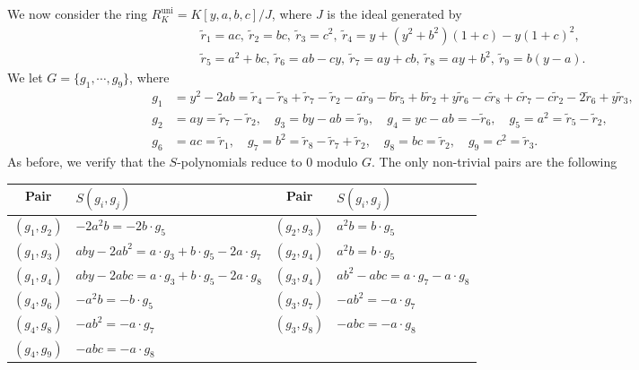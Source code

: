 \documentclass[a4paper, notitlepage, 10pt]{amsart}
\theoremstyle{plain} %
\theoremstyle{definition} %
\theoremstyle{remark} %
\numberwithin{equation}{section}
\newcommand{\uni}{\operatorname{uni}}
\begin{document}
\subsection{} We now consider the ring $R^{\uni}_K=K[y,a,b,c]/J$, where $J$ is the ideal generated by 
\begin{gather*}\widetilde{r}_1=ac, \ \widetilde{r}_2=bc, \ \widetilde{r}_3=c^2, \ 
\widetilde{r}_4=y+(y^2+b^2)(1+c)-y(1+c)^2,\\   \widetilde{r}_5=a^2+bc,\  \widetilde{r}_6=ab-cy, \  \widetilde{r}_7=ay+cb, \ \widetilde{r}_8=ay+b^2, \ \widetilde{r}_9=b(y-a).
\end{gather*}
We let $G=\{g_1,\cdots,g_9\}$, where
\begin{align*}
g_1 &= y^2 - 2ab = \widetilde{r}_4 - \widetilde{r}_8 + \widetilde{r}_7 - \widetilde{r}_2 - a\widetilde{r}_9 - b\widetilde{r}_5 + b\widetilde{r}_2 + y\widetilde{r}_6 - c\widetilde{r}_8 + c\widetilde{r}_7 - c\widetilde{r}_2 - 2\widetilde{r}_6 + y\widetilde{r}_3, \\
g_2 &= ay = \widetilde{r}_7 - \widetilde{r}_2, \quad g_3 = by - ab = \widetilde{r}_9, \quad g_4 = yc - ab = -\widetilde{r}_6, \quad
g_5= a^2 = \widetilde{r}_5 - \widetilde{r}_2, \\ g_6 &= ac = \widetilde{r}_1, \quad g_7 = b^2 = \widetilde{r}_8 - \widetilde{r}_7 + \widetilde{r}_2, \quad g_8 = bc = \widetilde{r}_2, \quad  g_9 = c^2 = \widetilde{r}_3.
\end{align*}
As before, we verify that the $S$-polynomials reduce to 0 modulo $G$. The only non-trivial pairs are the following
\begin{table}[h]
\centering
\footnotesize
{\renewcommand{\arraystretch}{0.96}
\begin{tabular}{|c|l|c|l|}
\hline
Pair & $S(g_i,g_j)$ & Pair & $S(g_i,g_j)$ \\
\hline
$(g_1,g_2)$ & $-2a^2b = -2b\cdot g_5$ & $(g_2,g_3)$ & $a^2b = b\cdot g_5$ \\
$(g_1,g_3)$ & $aby - 2ab^2 = a\cdot g_3 + b\cdot g_5 - 2a\cdot g_7$ & $(g_2,g_4)$ & $a^2b = b\cdot g_5$ \\
$(g_1,g_4)$ & $aby - 2abc = a\cdot g_3 + b\cdot g_5 - 2a\cdot g_8$ & $(g_3,g_4)$ & $ab^2 - abc = a\cdot g_7 - a\cdot g_8$ \\
$(g_4,g_6)$ & $-a^2b = -b\cdot g_5$ & $(g_3,g_7)$ & $-ab^2 = -a\cdot g_7$ \\
$(g_4,g_8)$ & $-ab^2 = -a\cdot g_7$ & $(g_3,g_8)$ & $-abc = -a\cdot g_8$ \\
$(g_4,g_9)$ & $-abc = -a\cdot g_8$ & & \\
\hline
\end{tabular}}
\end{table}
\end{document}
